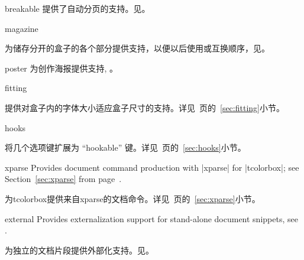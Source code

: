 {\begin{docTcbKey}[library]{breakable}{}{}
  提供了自动分页的支持。见。
\end{docTcbKey}

\begin{docTcbKey}[library]{magazine}{}{}

  为储存分开的盒子的各个部分提供支持，以便以后使用或互换顺序，见。
\end{docTcbKey}

\begin{docTcbKey}[library]{poster}{}{}
% 
  为创作海报提供支持, 。
\end{docTcbKey}

\begin{docTcbKey}[library]{fitting}{}{}

  提供对盒子内的字体大小适应盒子尺寸的支持。详见~\pageref{sec:fitting}页的~\ref{sec:fitting}小节。
\end{docTcbKey}

\begin{docTcbKey}[library]{hooks}{}{}

  将几个选项键扩展为 \enquote{hookable} 键。详见~\pageref{sec:hooks}页的~\ref{sec:hooks}小节。
\end{docTcbKey}

\begin{docTcbKey}[library]{xparse}{}{}
  Provides document command production with |xparse| for |tcolorbox|;
  see Section~\ref{sec:xparse} from page~\pageref{sec:xparse}.

  为tcolorbox提供来自xparse的文档命令。详见~\pageref{sec:xparse}页的~\ref{sec:xparse}小节。
\end{docTcbKey}

\begin{docTcbKey}[library]{external}{}{}
  Provides externalization support for stand-alone document snippets,
  see .

  为独立的文档片段提供外部化支持。见。
\end{docTcbKey}



}
